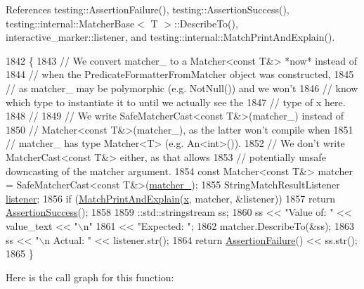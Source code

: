 References testing\+::\+Assertion\+Failure(), testing\+::\+Assertion\+Success(), testing\+::internal\+::\+Matcher\+Base$<$ T $>$\+::\+Describe\+To(), interactive\+\_\+marker\+::listener, and testing\+::internal\+::\+Match\+Print\+And\+Explain().


\begin{DoxyCode}
1842                                                                        \{
1843     \textcolor{comment}{// We convert matcher\_ to a Matcher<const T&> *now* instead of}
1844     \textcolor{comment}{// when the PredicateFormatterFromMatcher object was constructed,}
1845     \textcolor{comment}{// as matcher\_ may be polymorphic (e.g. NotNull()) and we won't}
1846     \textcolor{comment}{// know which type to instantiate it to until we actually see the}
1847     \textcolor{comment}{// type of x here.}
1848     \textcolor{comment}{//}
1849     \textcolor{comment}{// We write SafeMatcherCast<const T&>(matcher\_) instead of}
1850     \textcolor{comment}{// Matcher<const T&>(matcher\_), as the latter won't compile when}
1851     \textcolor{comment}{// matcher\_ has type Matcher<T> (e.g. An<int>()).}
1852     \textcolor{comment}{// We don't write MatcherCast<const T&> either, as that allows}
1853     \textcolor{comment}{// potentially unsafe downcasting of the matcher argument.}
1854     \textcolor{keyword}{const} Matcher<const T&> matcher = SafeMatcherCast<const T&>(\hyperlink{classtesting_1_1internal_1_1PredicateFormatterFromMatcher_a487a5e8a5f082947d060b1e07112b38d}{matcher\_});
1855     StringMatchResultListener \hyperlink{namespaceinteractive__marker_a0e579ab555212bb5e2c9f8a675b7618a}{listener};
1856     \textcolor{keywordflow}{if} (\hyperlink{namespacetesting_1_1internal_a0821df2611d54c79bac990719ad8a2dd}{MatchPrintAndExplain}(\hyperlink{namespaceinteractive__marker_acda52804aef30b460a72fb21ee01d69d}{x}, matcher, &listener))
1857       \textcolor{keywordflow}{return} \hyperlink{namespacetesting_ac1d0baedb17286c5c6c87bd1a45da8ac}{AssertionSuccess}();
1858 
1859     ::std::stringstream ss;
1860     ss << \textcolor{stringliteral}{"Value of: "} << value\_text << \textcolor{stringliteral}{"\(\backslash\)n"}
1861        << \textcolor{stringliteral}{"Expected: "};
1862     matcher.DescribeTo(&ss);
1863     ss << \textcolor{stringliteral}{"\(\backslash\)n  Actual: "} << listener.str();
1864     \textcolor{keywordflow}{return} \hyperlink{namespacetesting_a75cb789614cb1c28c34627a4a3c053df}{AssertionFailure}() << ss.str();
1865   \}
\end{DoxyCode}
Here is the call graph for this function\+:
